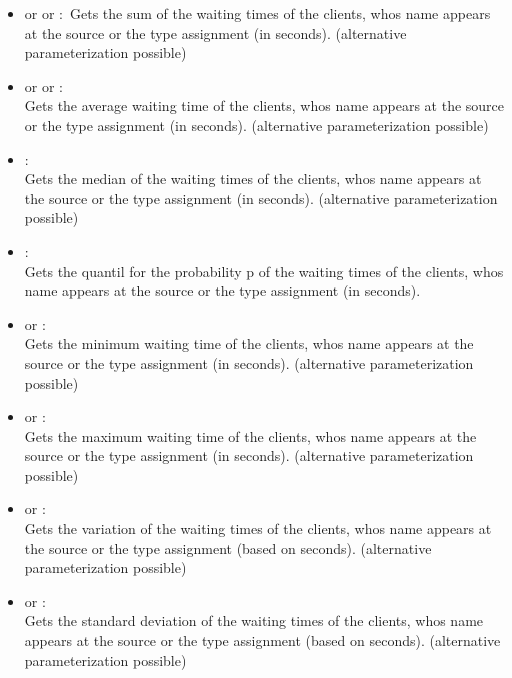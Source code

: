 \begin{itemize}

\item
{} or  or :\
Gets the sum of the waiting times of the clients, whos name appears at the source or the type assignment  (in seconds).
(alternative parameterization possible)

\item
{} or  or :\\
Gets the average waiting time of the clients, whos name appears at the source or the type assignment  (in seconds).
(alternative parameterization possible)

\item
{}:\\
Gets the median of the waiting times of the clients, whos name appears at the source or the type assignment  (in seconds).
(alternative parameterization possible)

\item
{}:\\
Gets the quantil for the probability p of the waiting times of the clients, whos name appears at the source or the type assignment  (in seconds).

\item
{} or :\\
Gets the minimum waiting time of the clients, whos name appears at the source or the type assignment  (in seconds).
(alternative parameterization possible)

\item
{} or :\\
Gets the maximum waiting time of the clients, whos name appears at the source or the type assignment  (in seconds).
(alternative parameterization possible)

\item
{} or :\\
Gets the variation of the waiting times of the clients, whos name appears at the source or the type assignment  (based on seconds).
(alternative parameterization possible)

\item
{} or :\\
Gets the standard deviation of the waiting times of the clients, whos name appears at the source or the type assignment  (based on seconds).
(alternative parameterization possible)


\end{itemize}

